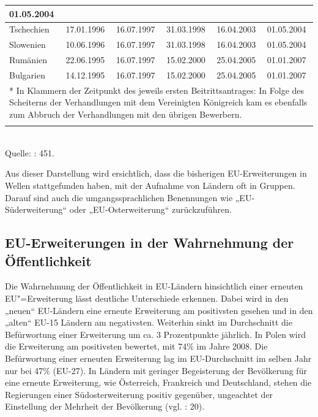 \begin{table}[H]
\begin{tabular}{|p{2cm}|p{2cm}|p{2cm}|p{2cm}|p{2cm}|p{2cm}|}
01.05.2004\\\hline
Tschechien&
17.01.1996&
16.07.1997&
31.03.1998&
16.04.2003&
01.05.2004\\\hline
Slowenien&
10.06.1996&
16.07.1997&
31.03.1998&
16.04.2003&
01.05.2004\\\hline
Rumänien&
22.06.1995&
16.07.1997&
15.02.2000&
25.04.2005&
01.01.2007\\\hline
Bulgarien&
14.12.1995&
16.07.1997&
15.02.2000&
25.04.2005&
01.01.2007\\\hline
\multicolumn{6}{|p{12cm}|}{* In Klammern der Zeitpunkt des jeweils ersten Beitrittsantrages: In Folge des Scheiterns der Verhandlungen mit dem Vereinigten Königreich kam es ebenfalls zum Abbruch der Verhandlungen mit den übrigen Bewerbern.}\\\hline
\multicolumn{6}{c}{}
\end{tabular}\\
Quelle: \cite{wessels} : 451.
\end{table}
Aus dieser Darstellung wird ersichtlich, dass die bisherigen EU-Erweiterungen in Wellen stattgefunden haben, mit der Aufnahme von Ländern oft in Gruppen. Darauf sind auch die umgangssprachlichen Benennungen wie „EU-Süderweiterung“ oder „EU-Osterweiterung“ zurückzuführen. 

\subsection{EU-Erweiterungen in der Wahrnehmung der Öffentlichkeit}
Die Wahrnehmung der Öffentlichkeit in EU-Ländern hinsichtlich einer erneuten EU"=Erweiterung lässt deutliche Unterschiede erkennen. Dabei wird in den „neuen“ EU-Ländern eine erneute Erweiterung am positivsten gesehen und in den „alten“ EU-15 Ländern am negativsten. Weiterhin sinkt im Durchschnitt die Befürwortung einer Erweiterung um ca. 3 Prozentpunkte jährlich. In Polen wird die Erweiterung am positivsten bewertet, mit 74\% im Jahre 2008. Die Befürwortung einer erneuten Erweiterung lag im EU-Durchschnitt im selben Jahr nur bei 47\% (EU-27). In Ländern mit geringer Begeisterung der Bevölkerung für eine erneute Erweiterung, wie Österreich, Frankreich und Deutschland, stehen die Regierungen einer Südosterweiterung positiv gegenüber, ungeachtet der Einstellung der Mehrheit der Bevölkerung (vgl. \cite{mus} : 20).\par

